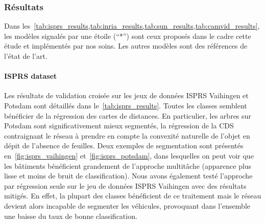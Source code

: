 \subsubsection{Résultats}

Dans les~\cref{tab:isprs_results,tab:inria_results,tab:sun_results,tab:camvid_results}, les modèles signalés par une étoile (``*'') sont ceux proposés dans le cadre cette étude et implémentés par nos soins. Les autres modèles sont des références de l'état de l'art.

\paragraph{ISPRS dataset}
Les résultats de validation croisée sur les jeux de données ISPRS Vaihingen et Potsdam sont détaillés dans le~\cref{tab:isprs_results}. Toutes les classes semblent bénéficier de la régression des cartes de distances. En particulier, les arbres sur Potsdam sont significativement mieux segmentés, la régression de la CDS contraignant le réseau à prendre en compte la convexité naturelle de l'objet en dépit de l'absence de feuilles. Deux exemples de segmentation sont présentés en~\cref{fig:isprs_vaihingen} et~\cref{fig:isprs_potsdam}, dans lesquelles on peut voir que les bâtiments bénéficient grandement de l'approche multitâche (apparence plus lisse et moins de bruit de classification). Nous avons également testé l'approche par régression seule sur le jeu de données ISPRS Vaihingen avec des résultats mitigés. En effet, la plupart des classes bénéficient de ce traitement mais le réseau devient alors incapable de segmenter les véhicules, provoquant dans l'ensemble une baisse du taux de bonne classification.

